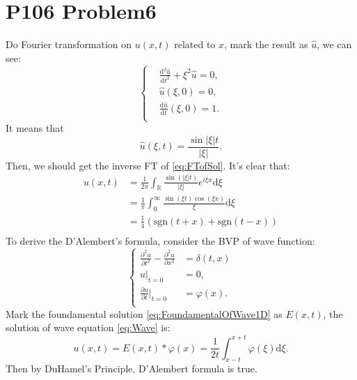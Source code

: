 \documentclass[a4paper]{ctexart}
\newcommand{\dif}{\mathrm{d}}
\newcommand{\difFrac}[2]{\frac{\dif #1}{\dif #2}}
\newcommand{\pdfFrac}[2]{\frac{\partial #1}{\partial #2}}
\begin{document}
\section*{P106 Problem6}
Do Fourier transformation on $u(x,t)$ related to $x$, mark the result as $\hat{u}$, we can see:
\begin{equation}
    \left\{
        \begin{aligned}
            &\difFrac{^2\hat{u}}{t^2}+\xi^2\hat{u}=0,\\
            &\hat{u}(\xi,0)=0,\\
            &\difFrac{\hat{u}}{t}(\xi,0)=1.\\
        \end{aligned}
    \right.
\end{equation}
It means that 
\begin{equation}
    \label{eq:FTofSol}
    \hat{u}(\xi,t)=\frac{\sin |\xi| t}{|\xi|}.
\end{equation}
Then, we should get the inverse FT of \eqref{eq:FTofSol}. It's clear that:
\begin{equation}
    \label{eq:FoundamentalOfWave1D}
    \begin{aligned}
        u(x,t)&=\frac{1}{2\pi}\int_{\mathbb{R}}\frac{\sin(|\xi| t)}{|\xi|}e^{i\xi x}\dif\xi\\
        &=\frac{1}{\pi}\int_{0}^{\infty}\frac{\sin(\xi t)\cos(\xi x)}{\xi}\dif\xi\\
        &=\frac{1}{4}(\text{sgn}(t+x)+\text{sgn}(t-x))\\
    \end{aligned}
\end{equation}
To derive the D'Alembert's formula, consider the BVP of wave function:
\begin{equation}
    \label{eq:Wave}
    \left\{
        \begin{aligned}
            \pdfFrac{^2u}{t^2}-\pdfFrac{^2u}{x^2}&=\delta(t,x)\\
            u|_{t=0}&=0,\\
            \pdfFrac{u}{t}|_{t=0}&=\varphi(x).\\
        \end{aligned}
    \right.
\end{equation}
Mark the foundamental solution \eqref{eq:FoundamentalOfWave1D} as $E(x,t)$, the solution of wave equation \eqref{eq:Wave} is:
\begin{equation}
    u(x,t)=E(x,t)*\varphi(x)=\frac{1}{2t}\int_{x-t}^{x+t}\varphi(\xi)\dif\xi.
\end{equation}
Then by DuHamel's Principle, D'Alembert formula is true.
\end{document}
